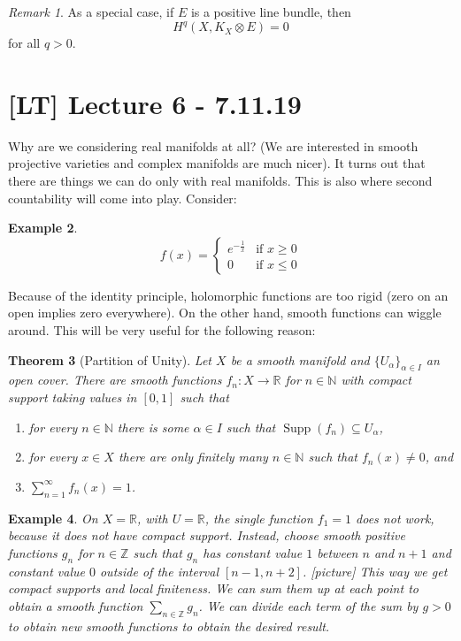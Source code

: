 \documentclass[12pt]{article}
\theoremstyle{darkgreentheorem}
\newtheorem{thm}{Theorem}
\theoremstyle{darkbluedefinition}
\theoremstyle{darkredexample}
\newtheorem{exa}[thm]{Example}
\theoremstyle{remark}
\newtheorem{rem}[thm]{Remark}
\newcommand{\N}{\mathbb{N}}
\newcommand{\Z}{\mathbb{Z}}
\newcommand{\R}{\mathbb{R}}
\newcommand{\1}{\mathbbm{1}}
\DeclareMathOperator{\Supp}{Supp}
\newcommand{\ot}{\otimes}
\begin{document}
\begin{rem}
    As a special case, if $E$ is a positive line bundle, then
    \[H^{q}(X,K_{X}\ot E)=0\]
    for all $q>0$.
\end{rem}

\section{[LT] Lecture 6 - 7.11.19}

Why are we considering real manifolds at all?
(We are interested in smooth projective varieties and complex manifolds are much nicer).
It turns out that there are things we can do only with real manifolds.
This is also where second countability will come into play.
Consider:

\begin{exa}
    \[ f(x)=\begin{cases} e^{-\frac{1}{x}} &\text{if } x\geqslant 0 \\ 0 &\text{if } x\leqslant 0
    \end{cases} \]
\end{exa}
Because of the identity principle, holomorphic functions are too rigid (zero on an open implies zero everywhere).
On the other hand, smooth functions can wiggle around.
This will be very useful for the following reason:

\begin{thm}[Partition of Unity]
    Let $X$ be a smooth manifold and $\{ U_{\alpha}\}_{\alpha\in I}$ an open cover.
    There are smooth functions $f_{n}\colon X\to \R$ for $n\in \N$ with compact support taking values in $[0,1]$ such that
    \begin{enumerate}[label=\roman*)]
	\item for every $n\in \N$ there is some $\alpha\in I$ such that $\Supp(f_{n})\subseteq U_{\alpha}$,
	\item for every $x\in X$ there are only finitely many $n\in \N$ such that $f_{n}(x)\neq 0$, and
	\item $\sum_{n=1}^{\infty} f_{n}(x)=1$.
    \end{enumerate}
\end{thm}

\begin{exa}
    On $X=\R$, with $U=\R$, the single function $f_{1}=1$ does not work, because it does not have compact support.
    Instead, choose smooth positive functions $g_{n}$ for $n\in \Z$ such that $g_{n}$ has constant value $1$ between $n$ and $n+1$ and constant value $0$ outside of the interval $[n-1,n+2]$.
    [picture]
    This way we get compact supports and local finiteness.
    We can sum them up at each point to obtain a smooth function $\sum_{n\in \Z}g_{n}$.
    We can divide each term of the sum by $g>0$ to obtain new smooth functions to obtain the desired result.
\end{exa}
\end{document}

